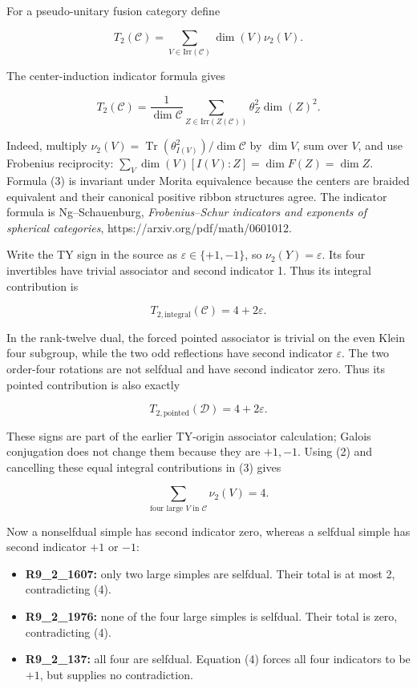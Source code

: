 For a pseudo-unitary fusion category define

\[
T_2(\mathcal C)=\sum_{V\in\mathrm{Irr}(\mathcal C)}
\dim(V)\nu_2(V).
\]

The center-induction indicator formula gives

\[
T_2(\mathcal C)=\frac1{\dim\mathcal C}
\sum_{Z\in\mathrm{Irr}(Z(\mathcal C))}\theta_Z^2\dim(Z)^2.
\tag{3}
\]

Indeed, multiply
\(\nu_2(V)=\operatorname{Tr}(\theta_{I(V)}^2)/\dim\mathcal C\) by
\(\dim V\), sum over \(V\), and use Frobenius reciprocity:
\(\sum_V\dim(V)[I(V):Z]=\dim F(Z)=\dim Z\). Formula (3) is invariant
under Morita equivalence because the centers are braided equivalent and
their canonical positive ribbon structures agree. The indicator formula
is Ng--Schauenburg, \emph{Frobenius--Schur indicators and exponents of
spherical categories}, https://arxiv.org/pdf/math/0601012.

Write the TY sign in the source as \(\varepsilon\in\{+1,-1\}\), so
\(\nu_2(Y)=\varepsilon\). Its four invertibles have trivial associator
and second indicator 1. Thus its integral contribution is

\[
T_{2,\mathrm{integral}}(\mathcal C)=4+2\varepsilon.
\]

In the rank-twelve dual, the forced pointed associator is trivial on the
even Klein four subgroup, while the two odd reflections have second
indicator \(\varepsilon\). The two order-four rotations are not selfdual
and have second indicator zero. Thus its pointed contribution is also
exactly

\[
T_{2,\mathrm{pointed}}(\mathcal D)=4+2\varepsilon.
\]

These signs are part of the earlier TY-origin associator calculation;
Galois conjugation does not change them because they are \(+1,-1\).
Using (2) and cancelling these equal integral contributions in (3) gives

\[
\boxed{\sum_{\text{four large }V\text{ in }\mathcal C}\nu_2(V)=4.}
\tag{4}
\]

Now a nonselfdual simple has second indicator zero, whereas a selfdual
simple has second indicator \(+1\) or \(-1\):

\begin{itemize}
\tightlist
\item
  \textbf{R9\_2\_1607:} only two large simples are selfdual. Their total
  is at most 2, contradicting (4).
\item
  \textbf{R9\_2\_1976:} none of the four large simples is selfdual.
  Their total is zero, contradicting (4).
\item
  \textbf{R9\_2\_137:} all four are selfdual. Equation (4) forces all
  four indicators to be \(+1\), but supplies no contradiction.
\end{itemize}


